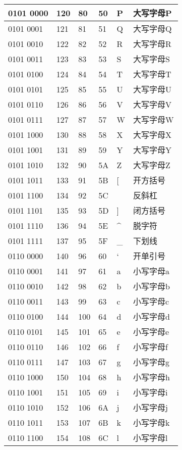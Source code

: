 \begin{longtable}{| p{.10\linewidth} | p{.08\linewidth} | p{.08\linewidth} | p{.10\linewidth} | p{.28\linewidth} | p{.15\linewidth} |}
0101 0000 & 120 & 80 & 50 & P & 大写字母P \\ \hline
0101 0001 & 121 & 81 & 51 & Q & 大写字母Q \\ \hline
0101 0010 & 122 & 82 & 52 & R & 大写字母R \\ \hline
0101 0011 & 123 & 83 & 53 & S & 大写字母S \\ \hline
0101 0100 & 124 & 84 & 54 & T & 大写字母T \\ \hline
0101 0101 & 125 & 85 & 55 & U & 大写字母U \\ \hline
0101 0110 & 126 & 86 & 56 & V & 大写字母V \\ \hline
0101 0111 & 127 & 87 & 57 & W & 大写字母W \\ \hline
0101 1000 & 130 & 88 & 58 & X & 大写字母X \\ \hline
0101 1001 & 131 & 89 & 59 & Y & 大写字母Y \\ \hline
0101 1010 & 132 & 90 & 5A & Z & 大写字母Z \\ \hline
0101 1011 & 133 & 91 & 5B & [ & 开方括号 \\ \hline
0101 1100 & 134 & 92 & 5C & \ & 反斜杠 \\ \hline
0101 1101 & 135 & 93 & 5D & ] & 闭方括号 \\ \hline
0101 1110 & 136 & 94 & 5E & \^ & 脱字符 \\ \hline
0101 1111 & 137 & 95 & 5F & \_ & 下划线 \\ \hline
0110 0000 & 140 & 96 & 60 & ` & 开单引号 \\ \hline
0110 0001 & 141 & 97 & 61 & a & 小写字母a \\ \hline
0110 0010 & 142 & 98 & 62 & b & 小写字母b \\ \hline
0110 0011 & 143 & 99 & 63 & c & 小写字母c \\ \hline
0110 0100 & 144 & 100 & 64 & d & 小写字母d \\ \hline
0110 0101 & 145 & 101 & 65 & e & 小写字母e \\ \hline
0110 0110 & 146 & 102 & 66 & f & 小写字母f \\ \hline
0110 0111 & 147 & 103 & 67 & g & 小写字母g \\ \hline
0110 1000 & 150 & 104 & 68 & h & 小写字母h \\ \hline
0110 1001 & 151 & 105 & 69 & i & 小写字母i \\ \hline
0110 1010 & 152 & 106 & 6A & j & 小写字母j \\ \hline
0110 1011 & 153 & 107 & 6B & k & 小写字母k \\ \hline
0110 1100 & 154 & 108 & 6C & l & 小写字母l \\ \hline

\end{longtable}
